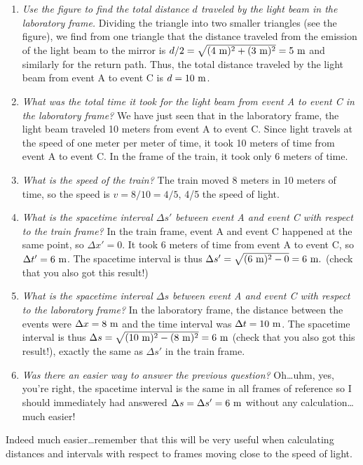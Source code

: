 {\begin{multicols}{2}
\begin{enumerate}
\item {\it Use the figure to find the total distance $d$ traveled by the light beam in the laboratory frame.} Dividing the triangle into two smaller triangles (see the figure), we find from one triangle that the distance traveled from the emission of the light beam to the mirror is $d/2=\sqrt{(4{\rm \ m})^2+(3{\rm \ m})^2}=5{\rm \ m}$ and similarly for the return path. Thus, the total distance traveled by the light beam from event A to event C is $d=10{\rm \ m}$.
\item {\it What was the total time it took for the light beam from event A to event C in the laboratory frame?} We have just seen that in the laboratory frame, the light beam traveled 10 meters from event A to event C. Since light travels at the speed of one meter per meter of time, it took 10 meters of time from event A to event C. In the frame of the train, it took only 6 meters of time.
\item {\it What is the speed of the train?} The train moved 8 meters in 10 meters of time, so the speed is $v=8/10=4/5$, 4/5 the speed of light.
\item {\it What is the spacetime interval $\Delta s'$ between event A and event C with respect to the train frame?} In the train frame, event A and event C happened at the same point, so $\Delta x'=0$. It took 6 meters of time from event A to event C, so $\Delta t'=6{\rm \ m}$. The spacetime interval is thus $\Delta s'=\sqrt{(6{\rm \ m})^2-0}=6{\rm \ m}.$ (check that you also got this result!)
\item {\it What is the spacetime interval $\Delta s$ between event A and event C with respect to the laboratory frame?} In the laboratory frame, the distance between the events were $\Delta x=8{\rm \ m}$ and the time interval was $\Delta t=10{\rm \ m}$. The spacetime interval is thus $\Delta s=\sqrt{(10{\rm \ m})^2-(8{\rm \ m})^2}=6{\rm \ m}$ (check that you also got this result!), exactly the same as $\Delta s'$ in the train frame.
\item {\it Was there an easier way to answer the previous question?} Oh\ldots uhm, yes, you're right, the spacetime interval is the same in all frames of reference so I should immediately had answered $\Delta s=\Delta s'=6{\rm \ m}$ without any calculation\ldots  much easier!
\end{enumerate}
Indeed much easier\ldots remember that this will be very useful when calculating distances and intervals with respect to frames moving close to the speed of light.


\end{multicols}}
